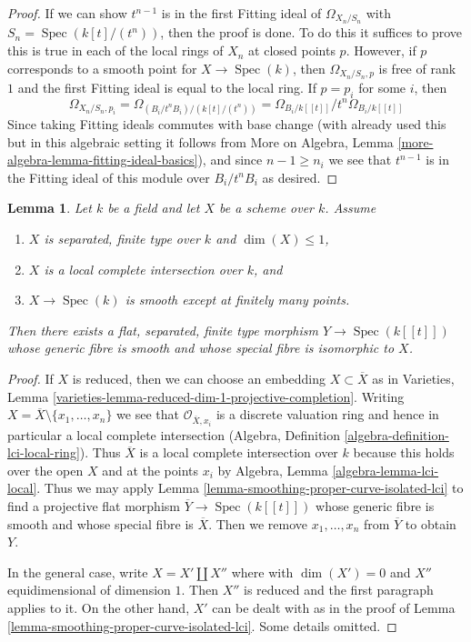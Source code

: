 \documentclass{stacks-project}
\theoremstyle{plain}
\newtheorem{lemma}[subsection]{Lemma}
\theoremstyle{definition}
\theoremstyle{remark}
\numberwithin{equation}{subsection}
\def\Spec{\mathop{\mathrm{Spec}}}
\begin{document}
\begin{proof}
If we can show $t^{n - 1}$ is in the first Fitting ideal of
$\Omega_{X_n/S_n}$ with $S_n = \Spec(k[t]/(t^n))$, then the proof is done.
To do this it suffices to prove this is true in each of
the local rings of $X_n$ at closed points $p$.
However, if $p$ corresponds to a smooth point for $X \to \Spec(k)$,
then $\Omega_{X_n/S_n, p}$ is free of rank $1$ and the first Fitting
ideal is equal to the local ring. If $p = p_i$ for some $i$, then
$$
\Omega_{X_n/S_n, p_i} =
\Omega_{(B_i/t^nB_i)/(k[t]/(t^n))} =
\Omega_{B_i/k[[t]]}/t^n\Omega_{B_i/k[[t]]}
$$
Since taking Fitting ideals commutes with base change
(with already used this but in this algebraic setting
it follows from More on Algebra, Lemma
\ref{more-algebra-lemma-fitting-ideal-basics}),
and since $n - 1 \geq n_i$ we see that $t^{n - 1}$ is
in the Fitting ideal of this module over $B_i/t^nB_i$ as desired.
\end{proof}

\begin{lemma}
\label{lemma-smoothing-curve-isolated-lci}
Let $k$ be a field and let $X$ be a scheme over $k$. Assume
\begin{enumerate}
\item $X$ is separated, finite type over $k$ and $\dim(X) \leq 1$,
\item $X$ is a local complete intersection over $k$, and
\item $X \to \Spec(k)$ is smooth except at finitely many points.
\end{enumerate}
Then there exists a flat, separated, finite type morphism $Y \to \Spec(k[[t]])$
whose generic fibre is smooth and whose special fibre is
isomorphic to $X$.
\end{lemma}

\begin{proof}
If $X$ is reduced, then we can choose an embedding
$X \subset \overline{X}$ as in
Varieties, Lemma \ref{varieties-lemma-reduced-dim-1-projective-completion}.
Writing $X = \overline{X} \setminus \{x_1, \ldots, x_n\}$
we see that $\mathcal{O}_{\overline{X}, x_i}$ is a discrete
valuation ring and hence in particular a local complete intersection
(Algebra, Definition \ref{algebra-definition-lci-local-ring}).
Thus $\overline{X}$ is a local complete intersection
over $k$ because this holds over the open $X$ and
at the points $x_i$ by Algebra, Lemma \ref{algebra-lemma-lci-local}.
Thus we may apply Lemma \ref{lemma-smoothing-proper-curve-isolated-lci}
to find a projective flat morphism $\overline{Y} \to \Spec(k[[t]])$
whose generic fibre is smooth and whose special fibre
is $\overline{X}$. Then we remove $x_1, \ldots, x_n$
from $\overline{Y}$ to obtain $Y$.

\medskip\noindent
In the general case, write $X = X' \amalg X''$ where
with $\dim(X') = 0$ and $X''$ equidimensional of dimension $1$.
Then $X''$ is reduced and the first paragraph applies to it.
On the other hand, $X'$ can be dealt with
as in the proof of Lemma \ref{lemma-smoothing-proper-curve-isolated-lci}.
Some details omitted.
\end{proof}









\end{document}

